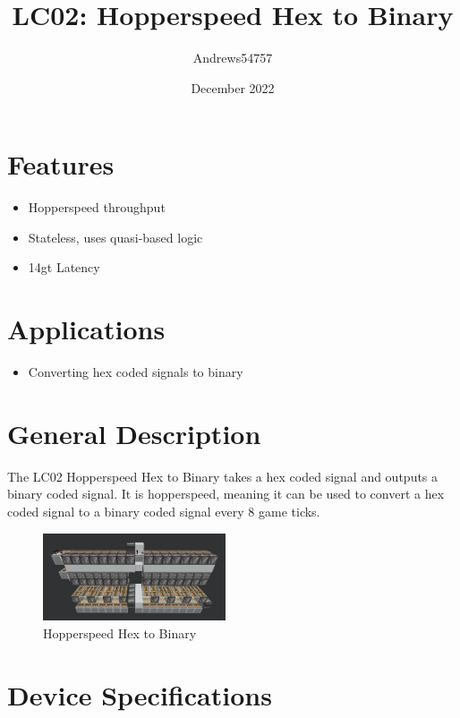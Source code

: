 \documentclass[10pt]{datasheet}
\title{LC02: Hopperspeed Hex to Binary}
\author{Andrews54757}
\date{December 2022}
\begin{document}
\maketitle

\section{Features}

\begin{itemize}
\item{Hopperspeed throughput}
\item{Stateless, uses quasi-based logic}
\item{14gt Latency}
\end{itemize}

\section{Applications}

\begin{itemize}
\item{Converting hex coded signals to binary}
\end{itemize}

\section{General Description}
The LC02 Hopperspeed Hex to Binary takes a hex coded signal and outputs a binary coded signal. It is hopperspeed, meaning it can be used to convert a hex coded signal to a binary coded signal every 8 game ticks.
\vfill\break

\begin{figure}[h]
    \centering
    \includegraphics[width=0.48\textwidth]{hextobin.png}
    \caption{\centering Hopperspeed Hex to Binary}
\end{figure}

\onecolumn

\section{Device Specifications}
\end{document}
